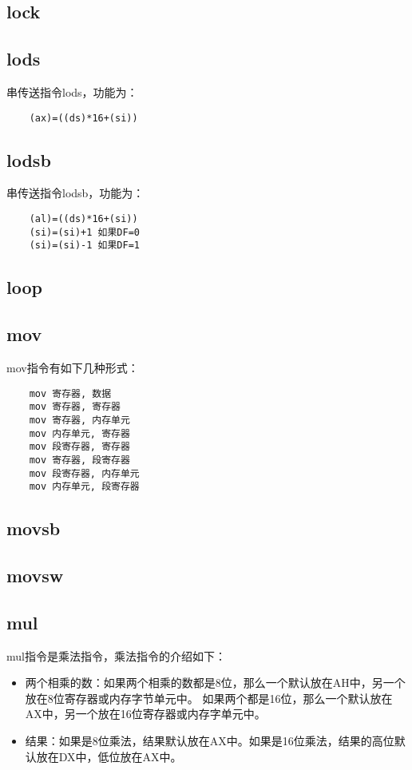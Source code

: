\documentclass[a4paper,left=2.5cm,right=2.5cm,11pt]{article}
\begin{document}
\subsection{lock}
\subsection{lods}
	串传送指令lods，功能为：
	\begin{lstlisting}
	(ax)=((ds)*16+(si))
	\end{lstlisting}

\subsection{lodsb}
	串传送指令lodsb，功能为：
	\begin{lstlisting}
	(al)=((ds)*16+(si))
	(si)=(si)+1 如果DF=0
	(si)=(si)-1 如果DF=1
	\end{lstlisting}

\subsection{loop}
\subsection{mov}
	mov指令有如下几种形式：
	\begin{lstlisting}
	mov 寄存器, 数据
	mov 寄存器, 寄存器
	mov 寄存器, 内存单元
	mov 内存单元, 寄存器
	mov 段寄存器, 寄存器
	mov 寄存器, 段寄存器
	mov 段寄存器, 内存单元
	mov 内存单元, 段寄存器
	\end{lstlisting}

\subsection{movsb}
\subsection{movsw}
\subsection{mul}
	mul指令是乘法指令，乘法指令的介绍如下：
	\begin{itemize}
		\item 两个相乘的数：如果两个相乘的数都是8位，那么一个默认放在AH中，另一个放在8位寄存器或内存字节单元中。
			如果两个都是16位，那么一个默认放在AX中，另一个放在16位寄存器或内存字单元中。
		\item 结果：如果是8位乘法，结果默认放在AX中。如果是16位乘法，结果的高位默认放在DX中，低位放在AX中。
	\end{itemize}
	
\end{document}
